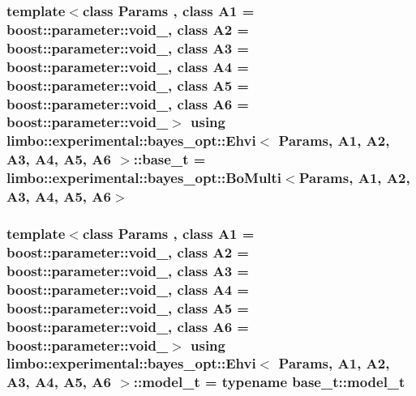 \subsubsection[{\texorpdfstring{base\+\_\+t}{base_t}}]{\setlength{\rightskip}{0pt plus 5cm}template$<$class Params , class A1  = boost\+::parameter\+::void\+\_\+, class A2  = boost\+::parameter\+::void\+\_\+, class A3  = boost\+::parameter\+::void\+\_\+, class A4  = boost\+::parameter\+::void\+\_\+, class A5  = boost\+::parameter\+::void\+\_\+, class A6  = boost\+::parameter\+::void\+\_\+$>$ using {\bf limbo\+::experimental\+::bayes\+\_\+opt\+::\+Ehvi}$<$ Params, A1, A2, A3, A4, A5, A6 $>$\+::{\bf base\+\_\+t} =  {\bf limbo\+::experimental\+::bayes\+\_\+opt\+::\+Bo\+Multi}$<$Params, A1, A2, A3, A4, A5, A6$>$}\hypertarget{classlimbo_1_1experimental_1_1bayes__opt_1_1_ehvi_ab01f05dc353ef1ba698cf856bea5fcf5}{}\label{classlimbo_1_1experimental_1_1bayes__opt_1_1_ehvi_ab01f05dc353ef1ba698cf856bea5fcf5}
\subsubsection[{\texorpdfstring{model\+\_\+t}{model_t}}]{\setlength{\rightskip}{0pt plus 5cm}template$<$class Params , class A1  = boost\+::parameter\+::void\+\_\+, class A2  = boost\+::parameter\+::void\+\_\+, class A3  = boost\+::parameter\+::void\+\_\+, class A4  = boost\+::parameter\+::void\+\_\+, class A5  = boost\+::parameter\+::void\+\_\+, class A6  = boost\+::parameter\+::void\+\_\+$>$ using {\bf limbo\+::experimental\+::bayes\+\_\+opt\+::\+Ehvi}$<$ Params, A1, A2, A3, A4, A5, A6 $>$\+::{\bf model\+\_\+t} =  typename {\bf base\+\_\+t\+::model\+\_\+t}}\hypertarget{classlimbo_1_1experimental_1_1bayes__opt_1_1_ehvi_a68c468aa4910dd82e2aeec342215f1ba}{}\label{classlimbo_1_1experimental_1_1bayes__opt_1_1_ehvi_a68c468aa4910dd82e2aeec342215f1ba}
